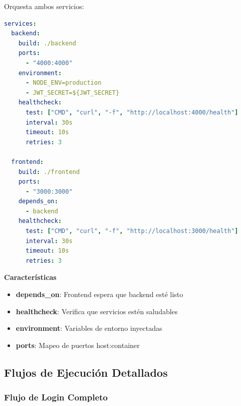 \documentclass[12pt,a4paper]{article}
\begin{document}
Orquesta ambos servicios:

\begin{lstlisting}[language=yaml, caption=docker-compose.yml]
services:
  backend:
    build: ./backend
    ports:
      - "4000:4000"
    environment:
      - NODE_ENV=production
      - JWT_SECRET=${JWT_SECRET}
    healthcheck:
      test: ["CMD", "curl", "-f", "http://localhost:4000/health"]
      interval: 30s
      timeout: 10s
      retries: 3

  frontend:
    build: ./frontend
    ports:
      - "3000:3000"
    depends_on:
      - backend
    healthcheck:
      test: ["CMD", "curl", "-f", "http://localhost:3000/health"]
      interval: 30s
      timeout: 10s
      retries: 3
\end{lstlisting}

\textbf{Características}
\begin{itemize}
    \item \textbf{depends\_on}: Frontend espera que backend esté listo
    \item \textbf{healthcheck}: Verifica que servicios estén saludables
    \item \textbf{environment}: Variables de entorno inyectadas
    \item \textbf{ports}: Mapeo de puertos host:container
\end{itemize}

\subsection{Flujos de Ejecución Detallados}

\subsubsection{Flujo de Login Completo}
\end{document}
